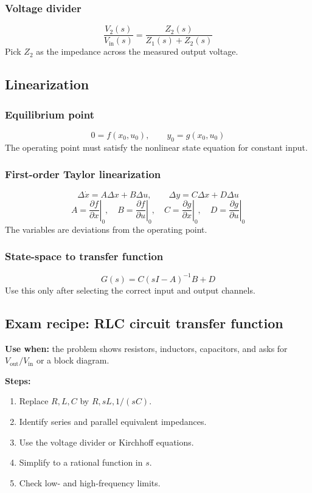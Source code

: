 \subsubsection{Voltage divider}
\[
\frac{V_2(s)}{V_{\mathrm{in}}(s)}=\frac{Z_2(s)}{Z_1(s)+Z_2(s)}
\]
Pick \(Z_2\) as the impedance across the measured output voltage.

\subsection{Linearization}

\subsubsection{Equilibrium point}
\[
0=f(x_0,u_0),\qquad y_0=g(x_0,u_0)
\]
The operating point must satisfy the nonlinear state equation for constant input.

\subsubsection{First-order Taylor linearization}
\[
\Delta\dot{x}=A\Delta x+B\Delta u,\qquad
\Delta y=C\Delta x+D\Delta u
\]
\[
A=\left.\frac{\partial f}{\partial x}\right|_0,\quad
B=\left.\frac{\partial f}{\partial u}\right|_0,\quad
C=\left.\frac{\partial g}{\partial x}\right|_0,\quad
D=\left.\frac{\partial g}{\partial u}\right|_0
\]
The variables are deviations from the operating point.

\subsubsection{State-space to transfer function}
\[
G(s)=C(sI-A)^{-1}B+D
\]
Use this only after selecting the correct input and output channels.

\subsection{Exam recipe: RLC circuit transfer function}

\textbf{Use when:} the problem shows resistors, inductors, capacitors, and asks for \(V_{\mathrm{out}}/V_{\mathrm{in}}\) or a block diagram.

\textbf{Steps:}
\begin{enumerate}
\item Replace \(R,L,C\) by \(R,sL,1/(sC)\).
\item Identify series and parallel equivalent impedances.
\item Use the voltage divider or Kirchhoff equations.
\item Simplify to a rational function in \(s\).
\item Check low- and high-frequency limits.
\end{enumerate}

